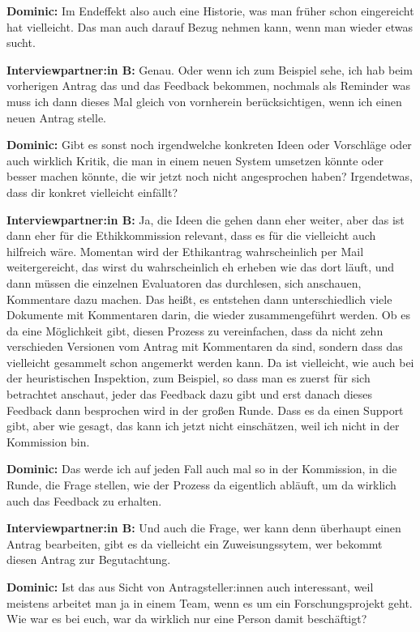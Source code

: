 \documentclass[a4paper,12pt,twoside]{scrreprt}
\begin{document}
\textbf{Dominic:} Im Endeffekt also auch eine Historie, was man früher schon eingereicht hat vielleicht. Das man auch darauf Bezug nehmen kann, wenn man wieder etwas sucht.

\textbf{Interviewpartner:in B:} Genau. Oder wenn ich zum Beispiel sehe, ich hab beim vorherigen Antrag das und das Feedback bekommen, nochmals als Reminder was muss ich dann dieses Mal gleich von vornherein berücksichtigen, wenn ich einen neuen Antrag stelle.

\textbf{Dominic:} Gibt es sonst noch irgendwelche konkreten Ideen oder Vorschläge oder auch wirklich Kritik, die man in einem neuen System umsetzen könnte oder besser machen könnte, die wir jetzt noch nicht angesprochen haben? Irgendetwas, dass dir konkret vielleicht einfällt?

\textbf{Interviewpartner:in B:} Ja, die Ideen die gehen dann eher weiter, aber das ist dann eher für die Ethikkommission relevant, dass es für die vielleicht auch hilfreich wäre. Momentan wird der Ethikantrag wahrscheinlich per Mail weitergereicht, das wirst du wahrscheinlich eh erheben wie das dort läuft, und dann müssen die einzelnen Evaluatoren das durchlesen, sich anschauen, Kommentare dazu machen. Das heißt, es entstehen dann unterschiedlich viele Dokumente mit Kommentaren darin, die wieder zusammengeführt werden. Ob es da eine Möglichkeit gibt, diesen Prozess zu vereinfachen, dass da nicht zehn verschieden Versionen vom Antrag mit Kommentaren da sind, sondern dass das vielleicht gesammelt schon angemerkt werden kann. Da ist vielleicht, wie auch bei der heuristischen Inspektion, zum Beispiel, so dass man es zuerst für sich betrachtet anschaut, jeder das Feedback dazu gibt und erst danach dieses Feedback dann besprochen wird in der großen Runde. Dass es da einen Support gibt, aber wie gesagt, das kann ich jetzt nicht einschätzen, weil ich nicht in der Kommission bin.

\textbf{Dominic:} Das werde ich auf jeden Fall auch mal so in der Kommission, in die Runde, die Frage stellen, wie der Prozess da eigentlich abläuft, um da wirklich auch das Feedback zu erhalten.

\textbf{Interviewpartner:in B:} Und auch die Frage, wer kann denn überhaupt einen Antrag bearbeiten, gibt es da vielleicht ein Zuweisungssytem, wer bekommt diesen Antrag zur Begutachtung.

\textbf{Dominic:} Ist das aus Sicht von Antragsteller:innen auch interessant, weil meistens arbeitet man ja in einem Team, wenn es um ein Forschungsprojekt geht. Wie war es bei euch, war da wirklich nur eine Person damit beschäftigt?
\end{document}

